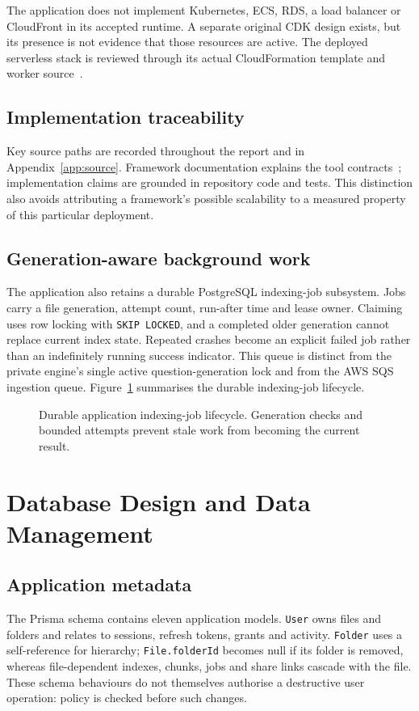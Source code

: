 \documentclass[11pt,a4paper,oneside]{report}
\newcommand{\ShortCaption}[1]{\csname ShortCaption#1\endcsname}
\newcommand{\diagram}[3]{\par\begin{figure}[htbp]\centering\sbox{\DiagramBox}{}\ifdim\wd\DiagramBox>\linewidth\resizebox{\linewidth}{!}{\usebox{\DiagramBox}}\else\usebox{\DiagramBox}\fi\caption[\ShortCaption{#1}]{#2}\label{fig:#3}\end{figure}\par}
\begin{document}
The application does not implement Kubernetes, ECS, RDS, a load balancer or CloudFront in its accepted runtime. A separate original CDK design exists, but its presence is not evidence that those resources are active. The deployed serverless stack is reviewed through its actual CloudFormation template and worker source~\cite{cloudformation}.
\section{Implementation traceability}
Key source paths are recorded throughout the report and in Appendix~\ref{app:source}. Framework documentation explains the tool contracts~\cite{react,express,fastapi,prisma}; implementation claims are grounded in repository code and tests. This distinction also avoids attributing a framework's possible scalability to a measured property of this particular deployment.
\section{Generation-aware background work}
The application also retains a durable PostgreSQL indexing-job subsystem. Jobs carry a file generation, attempt count, run-after time and lease owner. Claiming uses row locking with \texttt{SKIP LOCKED}, and a completed older generation cannot replace current index state. Repeated crashes become an explicit failed job rather than an indefinitely running success indicator. This queue is distinct from the private engine's single active question-generation lock and from the AWS SQS ingestion queue.
Figure~\ref{fig:jobs} summarises the durable indexing-job lifecycle.
\diagram{job_lifecycle}{Durable application indexing-job lifecycle. Generation checks and bounded attempts prevent stale work from becoming the current result.}{jobs}
\FloatBarrier

\chapter{Database Design and Data Management}
\section{Application metadata}
The Prisma schema contains eleven application models. \texttt{User} owns files and folders and relates to sessions, refresh tokens, grants and activity. \texttt{Folder} uses a self-reference for hierarchy; \texttt{File.folderId} becomes null if its folder is removed, whereas file-dependent indexes, chunks, jobs and share links cascade with the file. These schema behaviours do not themselves authorise a destructive user operation: policy is checked before such changes.
\end{document}
